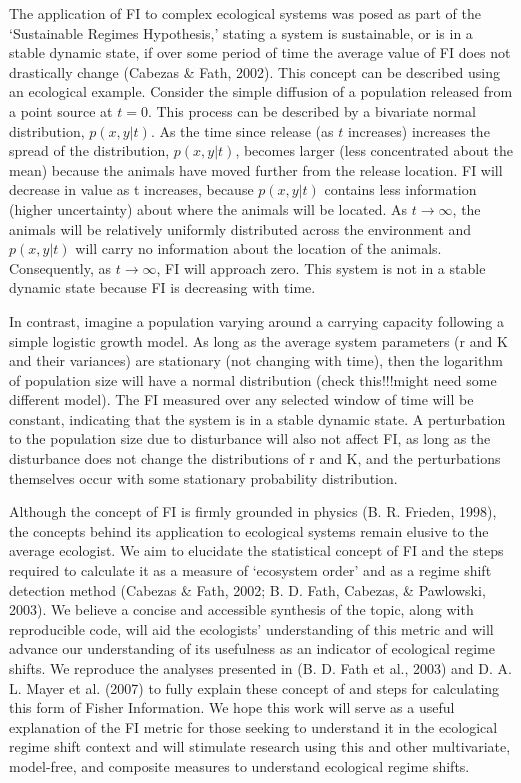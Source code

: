 \documentclass[12pt,twoside,openany]{reedthesis}
\begin{document}
The application of FI to complex ecological systems was posed as part of
the `Sustainable Regimes Hypothesis,' stating a system is sustainable,
or is in a stable dynamic state, if over some period of time the average
value of FI does not drastically change (Cabezas \& Fath, 2002). This
concept can be described using an ecological example. Consider the
simple diffusion of a population released from a point source at
\(t = 0\). This process can be described by a bivariate normal
distribution, \(p(x,y\vert t)\). As the time since release (as \(t\)
increases) increases the spread of the distribution, \(p(x,y\vert t)\),
becomes larger (less concentrated about the mean) because the animals
have moved further from the release location. FI will decrease in value
as t increases, because \(p(x,y\vert t)\) contains less information
(higher uncertainty) about where the animals will be located. As
\(t \rightarrow \infty\), the animals will be relatively uniformly
distributed across the environment and \(p(x,y\vert t)\) will carry no
information about the location of the animals. Consequently, as
\(t \rightarrow \infty\), FI will approach zero. This system is not in a
stable dynamic state because FI is decreasing with time.

In contrast, imagine a population varying around a carrying capacity
following a simple logistic growth model. As long as the average system
parameters (r and K and their variances) are stationary (not changing
with time), then the logarithm of population size will have a normal
distribution (check this!!!might need some different model). The FI
measured over any selected window of time will be constant, indicating
that the system is in a stable dynamic state. A perturbation to the
population size due to disturbance will also not affect FI, as long as
the disturbance does not change the distributions of r and K, and the
perturbations themselves occur with some stationary probability
distribution.

Although the concept of FI is firmly grounded in physics (B. R. Frieden,
1998), the concepts behind its application to ecological systems remain
elusive to the average ecologist. We aim to elucidate the statistical
concept of FI and the steps required to calculate it as a measure of
`ecosystem order' and as a regime shift detection method (Cabezas \&
Fath, 2002; B. D. Fath, Cabezas, \& Pawlowski, 2003). We believe a
concise and accessible synthesis of the topic, along with reproducible
code, will aid the ecologists' understanding of this metric and will
advance our understanding of its usefulness as an indicator of
ecological regime shifts. We reproduce the analyses presented in (B. D.
Fath et al., 2003) and D. A. L. Mayer et al. (2007) to fully explain
these concept of and steps for calculating this form of Fisher
Information. We hope this work will serve as a useful explanation of the
FI metric for those seeking to understand it in the ecological regime
shift context and will stimulate research using this and other
multivariate, model-free, and composite measures to understand
ecological regime shifts.
\end{document}
